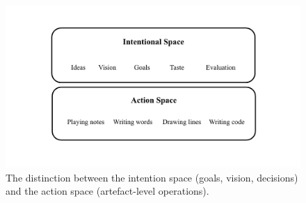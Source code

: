 \begin{figure}[H]
    \centering
    \includegraphics[width=1\linewidth]{intention action spaces.png}
    \caption{The distinction between the intention space (goals, vision, decisions) and the action space (artefact-level operations).}
    \label{fig:intention-action-spaces}
\end{figure}

